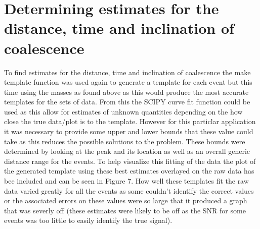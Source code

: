 \documentclass{article}
\begin{document}
\section*{Determining estimates for the distance, time and inclination of coalescence}



To find estimates for the distance, time and inclination of coalescence the make template function was used again
to generate a template for each event but this time using the masses as found above
as this would produce the most accurate templates for the sets of data.
From this the SCIPY curve fit function could be used as this allow for estimates of unknown quantities depending on the
how close the true data/plot is to the template. However for this particlar application
it was necessary to provide some upper and lower bounds that these value could take as this reduces the possible solutions
to the problem. These bounds were determined by looking at the peak and its location as well as an overall generic distance range
for the events. To help visualize this fitting of the data the plot of the generated template using these best estimates
overlayed on the raw data has bee included and can be seen in Figure 7.
How well these templates fit the raw data varied greatly for all the events as some couldn't identify the correct values
or the associated errors on these values were so large that it produced a graph that was severly off (these estimates were likely to be off
as the SNR for some events was too little to easily identify the true signal).
\end{document}
